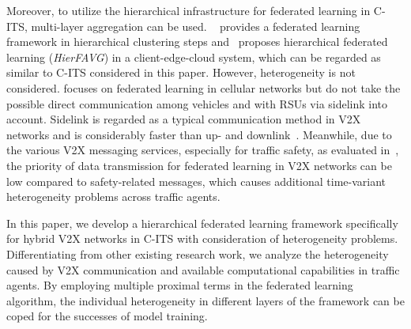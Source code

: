 Moreover, to utilize the hierarchical infrastructure for federated learning in C-ITS, multi-layer aggregation can be used. %
~\cite{9207469} provides a federated learning framework in hierarchical clustering steps and~\cite{9148862} proposes hierarchical federated learning (\emph{HierFAVG}) in a client-edge-cloud system, which can be regarded as similar to C-ITS considered in this paper. However, heterogeneity is not considered. %
\cite{9054634} focuses on federated learning in cellular networks but do not take the possible direct communication among vehicles and with RSUs via sidelink into account.  %
Sidelink is regarded as a typical communication method in V2X networks and is considerably faster than up- and downlink~\cite{Hegde2020-VNC,5GNRV2X-tutorial}. %
Meanwhile, due to the various V2X messaging services, especially for traffic safety, as evaluated in~\cite{Kuehlmorgen2020}, the priority of data transmission for federated learning in V2X networks can be low compared to safety-related messages, which causes additional time-variant heterogeneity problems across traffic agents.

In this paper, we develop a hierarchical federated learning framework specifically for hybrid V2X networks in C-ITS with consideration of heterogeneity problems. Differentiating from other existing research work, we analyze the heterogeneity caused by V2X communication and available computational capabilities in traffic agents. By employing multiple proximal terms in the federated learning algorithm, the individual heterogeneity in different layers of the framework can be coped for the successes of model training.


